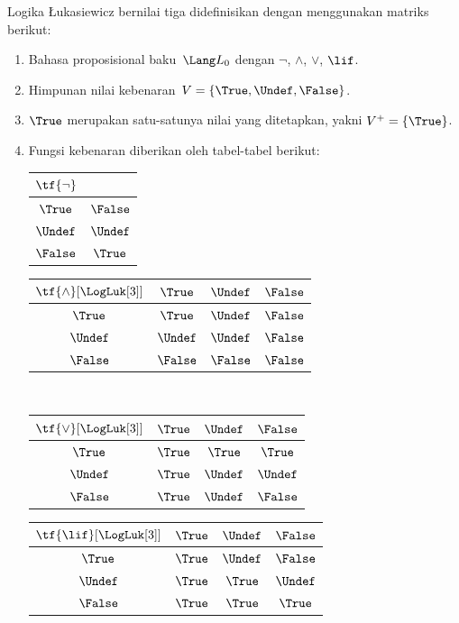 \documentclass[../../../include/open-logic-section]{subfiles}
\begin{document}
\begin{defn}
Logika \L ukasiewicz bernilai tiga didefinisikan dengan menggunakan matriks
berikut:
\begin{enumerate}
  \item Bahasa proposisional baku~$\Lang L_0$ dengan $\lnot$, $\land$,
  $\lor$, $\lif$.
  \item Himpunan nilai kebenaran~$V=\{\True,\Undef,\False\}$.
  \item $\True$ merupakan satu-satunya nilai yang ditetapkan, yakni
  $V^+=\{\True\}$.
  \item Fungsi kebenaran diberikan oleh tabel-tabel berikut:
  \begin{center}
    \begin{tabular}{c|c}
      $\tf{\lnot}$ & \\
      \hline
      $\True$ & $\False$ \\
      $\Undef$ & $\Undef$ \\
      $\False$ & $\True$
    \end{tabular}
    \quad
    \begin{tabular}{c|ccc}
      $\tf{\land}[\LogLuk[3]]$ & $\True$ & $\Undef$ & $\False$ \\
      \hline
      $\True$ & $\True$ & $\Undef$ & $\False$ \\
      $\Undef$ & $\Undef$ & $\Undef$ & $\False$\\
      $\False$ & $\False$ & $\False$ & $\False$
    \end{tabular}
    \\[2ex]
    \begin{tabular}{c|ccc}
      $\tf{\lor}[\LogLuk[3]]$ & $\True$ & $\Undef$ & $\False$ \\
      \hline
      $\True$ & $\True$ & $\True$ & $\True$ \\
      $\Undef$ & $\True$ & $\Undef$ & $\Undef$ \\
      $\False$ & $\True$ & $\Undef$ & $\False$
    \end{tabular}
    \quad
    \begin{tabular}{c|ccc}
      $\tf{\lif}[\LogLuk[3]]$ & $\True$ & $\Undef$ & $\False$ \\
      \hline
      $\True$ & $\True$ & $\Undef$ & $\False$ \\
      $\Undef$ & $\True$ & $\True$ & $\Undef$  \\
      $\False$ & $\True$ & $\True$ & $\True$
    \end{tabular}
  \end{center}
\end{enumerate}
\end{defn}
\end{document}
